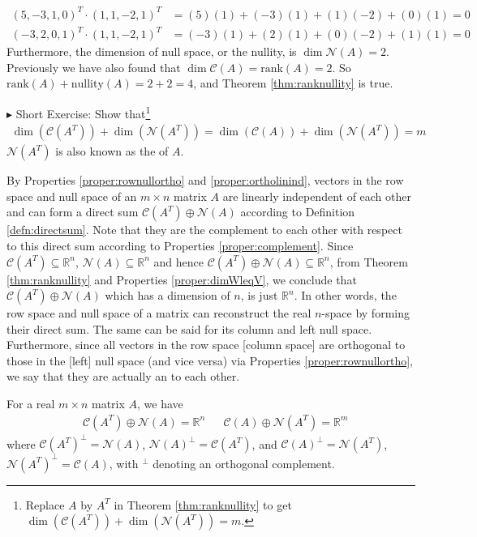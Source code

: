 \begin{solution}
\begin{align*}
(5,-3,1,0)^T \cdot (1,1,-2,1)^T &= (5)(1)+(-3)(1)+(1)(-2)+(0)(1) = 0 \\
(-3,2,0,1)^T \cdot (1,1,-2,1)^T &= (-3)(1)+(2)(1)+(0)(-2)+(1)(1) = 0
\end{align*}
Furthermore, the dimension of null space, or the nullity, is $\dim{\mathcal{N}(A)} = 2$. Previously we have also found that $\dim{\mathcal{C}(A)} = \text{rank}(A) = 2$. So $\text{rank}(A) + \text{nullity}(A) = 2+2 = 4$, and Theorem \ref{thm:ranknullity} is true.
\end{solution}
$\blacktriangleright$ Short Exercise: Show that\footnote{Replace $A$ by $A^T$ in Theorem \ref{thm:ranknullity} to get $\dim(\mathcal{C}(A^T)) + \dim(\mathcal{N}(A^T)) = m$.}
\begin{align*}
\dim(\mathcal{C}(A^T)) + \dim(\mathcal{N}(A^T)) = \dim(\mathcal{C}(A)) + \dim(\mathcal{N}(A^T)) = m   
\end{align*} $\mathcal{N}(A^T)$ is also known as the  of $A$.

By Properties \ref{proper:rownullortho} and \ref{proper:ortholinind}, vectors in the row space and null space of an $m \times n$ matrix $A$ are linearly independent of each other and can form a direct sum $\mathcal{C}(A^T) \oplus \mathcal{N}(A)$ according to Definition \ref{defn:directsum}. Note that they are the complement to each other with respect to this direct sum according to Properties \ref{proper:complement}. Since $\mathcal{C}(A^T) \subseteq \mathbb{R}^n$, $\mathcal{N}(A) \subseteq \mathbb{R}^n$ and hence $\mathcal{C}(A^T) \oplus \mathcal{N}(A) \subseteq \mathbb{R}^n$, from Theorem \ref{thm:ranknullity} and Properties \ref{proper:dimWleqV}, we conclude that $\mathcal{C}(A^T) \oplus \mathcal{N}(A)$ which has a dimension of $n$, is just $\mathbb{R}^n$. In other words, the row space and null space of a matrix can reconstruct the real $n$-space by forming their direct sum. The same can be said for its column and left null space. Furthermore, since all vectors in the row space [column space] are orthogonal to those in the [left] null space (and vice versa) via Properties \ref{proper:rownullortho}, we say that they are actually an  to each other.

\begin{proper}
\label{proper:funsubsortho}
For a real $m \times n$ matrix $A$, we have
\begin{align}
& \mathcal{C}(A^T) \oplus \mathcal{N}(A) = \mathbb{R}^n & & \mathcal{C}(A) \oplus \mathcal{N}(A^T) = \mathbb{R}^m
\end{align}
where $\mathcal{C}(A^T)^\perp = \mathcal{N}(A)$, $\mathcal{N}(A)^\perp = \mathcal{C}(A^T)$, and $\mathcal{C}(A)^\perp = \mathcal{N}(A^T)$, $\mathcal{N}(A^T)^\perp = \mathcal{C}(A)$, with $^\perp$ denoting an orthogonal complement.
\end{proper}

